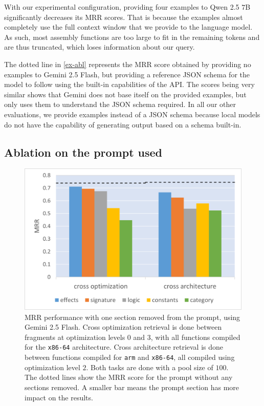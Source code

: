 With our experimental configuration, providing four examples to Qwen 2.5 \(7\)B significantly decreases its MRR scores. That is because
the examples almost completely use the full context window that we provide to the language model. As such, most assembly functions are
too large to fit in the remaining tokens and are thus truncated, which loses information about our query.

The dotted line in \autoref{ex-abl} represents the MRR score obtained by providing no examples to Gemini 2.5 Flash, but providing a reference JSON
schema for the model to follow using the built-in capabilities of the API. The scores being very similar shows that Gemini does not base itself on the
provided examples, but only uses them to understand the JSON schema required. In all our other evaluations, we provide examples instead of a JSON
schema because local models do not have the capability of generating output based on a schema built-in.

\subsection{Ablation on the prompt used}

\begin{figure}
\centerline{\includegraphics[width=\linewidth]{prompt-ablation}}
\caption{
MRR performance with one section removed from the prompt, using Gemini 2.5 Flash. Cross optimization retrieval is done between fragments at
optimization levels \(0\) and \(3\), with all functions compiled for the \texttt{x86-64} architecture. Cross architecture retrieval is done between functions
compiled for \texttt{arm} and \texttt{x86-64}, all compiled using optimization level \(2\). Both tasks are done with a pool size of \(100\). The dotted lines
show the MRR score for the prompt without any sections removed. A smaller bar means the prompt section has more impact on the results.}
\label{prompt-abl}
\end{figure}

